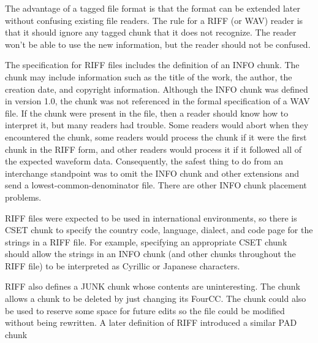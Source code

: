 \documentclass[12pt, a4paper]{article}
\begin{document}
The advantage of a tagged file format is that the format can be extended later without confusing existing file readers. The rule for a RIFF (or WAV) reader is that it should ignore any tagged chunk that it does not recognize. The reader won't be able to use the new information, but the reader should not be confused.

The specification for RIFF files includes the definition of an INFO chunk. The chunk may include information such as the title of the work, the author, the creation date, and copyright information. Although the INFO chunk was defined in version 1.0, the chunk was not referenced in the formal specification of a WAV file. If the chunk were present in the file, then a reader should know how to interpret it, but many readers had trouble. Some readers would abort when they encountered the chunk, some readers would process the chunk if it were the first chunk in the RIFF form, and other readers would process it if it followed all of the expected waveform data. Consequently, the safest thing to do from an interchange standpoint was to omit the INFO chunk and other extensions and send a lowest-common-denominator file. There are other INFO chunk placement problems.

RIFF files were expected to be used in international environments, so there is CSET chunk to specify the country code, language, dialect, and code page for the strings in a RIFF file. For example, specifying an appropriate CSET chunk should allow the strings in an INFO chunk (and other chunks throughout the RIFF file) to be interpreted as Cyrillic or Japanese characters.

RIFF also defines a JUNK chunk whose contents are uninteresting. The chunk allows a chunk to be deleted by just changing its FourCC. The chunk could also be used to reserve some space for future edits so the file could be modified without being rewritten. A later definition of RIFF introduced a similar PAD  chunk
\end{document}
